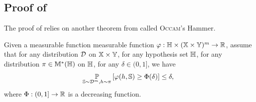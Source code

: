 \begin{noaddcontents}
\section{Proof of }
\label{ap:pac-bayes:sec:proof-disintegrated-blanchard}

The proof of  relies on another theorem from \citet[Theorem~2.4]{BlanchardFleuret2007} called \textsc{Occam}'s Hammer.

\begin{lemma} \label{ap:pac-bayes:lemma:hammer}
Given a measurable function measurable function $\varphi: \mathbb{H}\times(\mathbb{X}\times\mathbb{Y})^m\to \mathbb{R}$, assume that for any distribution $\mathcal{D}$ on $\mathbb{X}\times\mathbb{Y}$, for any hypothesis set $\mathbb{H}$, for any distribution $\pi\in\mathbb{M}^{*}(\mathbb{H})$ on $\mathbb{H}$, for any $\delta\in(0, 1]$, we have
\begin{align*}
    \operatorname*{\mathbb{P}}_{\mathbb{S}\sim\mathcal{D}^m,h\sim\pi}\left[ \varphi(h,\mathbb{S}) \ge \Phi(\delta) \right] \le \delta,
\end{align*}
where $\Phi: (0,1] \to \mathbb{R}$ is a decreasing function.


\end{lemma}
\end{noaddcontents}
